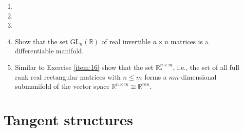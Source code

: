 \documentclass{article}
\begin{document}
\begin{enumerate}[start=13]
  \item
  \item
  \item
  \item \label{item:16} Show that the set GL$_{n}(\mathbb{R})$ of real invertible $n\times n$ matrices is a differentiable manifold.

  \item Similar to Exercise \ref{item:16} show that the set $\mathbb{R}^{n\times m}_{*}$, i.e., the set of all full rank real rectangular matrices with $n\leq m$ forms a $nm$-dimensional submanifold of the vector space $\mathbb{R}^{n\times m}\cong\mathbb{R}^{nm}$.
\end{enumerate}

\section{Tangent structures}
\end{document}
